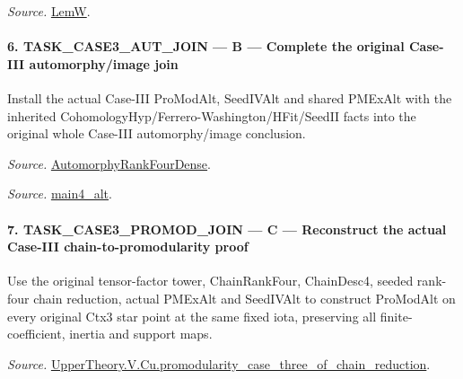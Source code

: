 \emph{Source.} \href{https://github.com/CocoSgt/riemann-hypothesis-lean/blob/7cbf7a0c32fca1badf05931879a37c3f8a2b03b4/src/Development/AutomorphicArithmetic/AutomorphicVarieties/AutomorphicCases/AutomorphyUnramifiedCoefficients.lean#L19-L22}{LemW}.



\paragraph{6. TASK\_\allowbreak CASE3\_\allowbreak AUT\_\allowbreak JOIN — B — Complete the original Case-III automorphy/image join}

Install the actual Case-III ProModAlt, SeedIVAlt and shared PMExAlt with the inherited CohomologyHyp/Ferrero-Washington/HFit/SeedII facts into the original whole Case-III automorphy/image conclusion.

\emph{Source.} \href{https://github.com/CocoSgt/riemann-hypothesis-lean/blob/7cbf7a0c32fca1badf05931879a37c3f8a2b03b4/src/Development/AutomorphicArithmetic/AutomorphicVarieties/ModularityArgument/ThresholdArguments/DenseThresholdCases/PromodularityCaseThree.lean#L43-L44}{AutomorphyRankFourDense}.

\emph{Source.} \href{https://github.com/CocoSgt/riemann-hypothesis-lean/blob/7cbf7a0c32fca1badf05931879a37c3f8a2b03b4/src/Development/AutomorphicArithmetic/AutomorphicVarieties/ModularityArgument/ThresholdArguments/DenseThresholdCases/CuFinal.lean#L44-L44}{main4\_\allowbreak alt}.



\paragraph{7. TASK\_\allowbreak CASE3\_\allowbreak PROMOD\_\allowbreak JOIN — C — Reconstruct the actual Case-III chain-to-promodularity proof}

Use the original tensor-factor tower, ChainRankFour, ChainDesc4, seeded rank-four chain reduction, actual PMExAlt and SeedIVAlt to construct ProModAlt on every original Ctx3 star point at the same fixed iota, preserving all finite-coefficient, inertia and support maps.

\emph{Source.} \href{https://github.com/CocoSgt/riemann-hypothesis-lean/blob/7cbf7a0c32fca1badf05931879a37c3f8a2b03b4/src/Development/AutomorphicArithmetic/AutomorphicVarieties/ModularityArgument/ThresholdArguments/DenseThresholdCases/PromodularityCaseThreeOfLemmas.lean#L131-L153}{UpperTheory.V.Cu.promodularity\_\allowbreak case\_\allowbreak three\_\allowbreak of\_\allowbreak chain\_\allowbreak reduction}.

